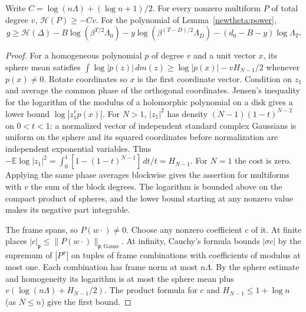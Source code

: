 \begin{lemma}\label{newtheta:heights}
Write \(C=\log(n\Lambda)+(\log n+1)/2\). For every nonzero
multiform \(P\) of total degree \(v\),
\(\mathcal H(P)\ge-Cv\). For the polynomial of
Lemma~\ref{newtheta:power},
\[
 g\ge\mathcal H(\Delta)
 -B\log(\beta^{T/2}\Lambda_0)
 -y\log(\beta^{(T-D)/2}\Lambda_D)
 -(d_0-B-y)\log\Lambda_T .
\]
\end{lemma}
\begin{proof}
For a homogeneous polynomial \(p\) of degree \(v\) and a unit vector
\(x\), its sphere mean satisfies
\(\int\log|p(z)|\,dm(z)\ge\log|p(x)|-vH_{N-1}/2\) whenever
\(p(x)\ne0\). Rotate coordinates so \(x\) is the first coordinate vector.
Condition on \(z_1\) and average the common phase of the orthogonal
coordinates. Jensen's inequality for the logarithm of the modulus of
a holomorphic polynomial on a disk gives a lower bound
\(\log|z_1^v p(x)|\). For \(N>1\), \(|z_1|^2\) has density
\((N-1)(1-t)^{N-2}\) on \(0<t<1\): a normalized vector of independent
standard complex Gaussians is uniform on the sphere and its squared
coordinates before normalization are independent exponential variables.
Thus \(-\mathbb E\log |z_1|^2=\int_0^1[1-(1-t)^{N-1}]\,dt/t
=H_{N-1}\). For \(N=1\) the cost is zero. Applying the same phase
averages blockwise gives the assertion for multiforms with \(v\) the
sum of the block degrees. The logarithm is bounded above on the
compact product of spheres, and the lower bound starting at any
nonzero value makes its negative part integrable.

The frame spans, so \(P(w\cdot)\ne0\). Choose any nonzero coefficient
\(c\) of it. At finite places \(|c|_{\mathfrak p}\le
\|P(w\cdot)\|_{\mathfrak p,\mathrm{Gauss}}\). At infinity, Cauchy's
formula bounds \(|\sigma c|\) by the supremum of \(|P^\sigma|\)
on tuples of frame combinations with coefficients of modulus at most
one. Each combination has frame norm at most \(n\Lambda\). By the
sphere estimate and homogeneity its logarithm is at most the sphere
mean plus \(v(\log(n\Lambda)+H_{N-1}/2)\). The product formula for
\(c\) and \(H_{N-1}\le1+\log n\) (as \(N\le n\)) give the first
bound.


\end{proof}
